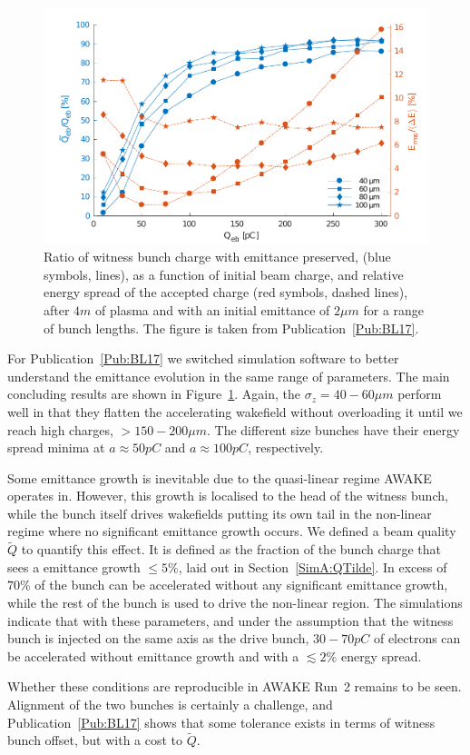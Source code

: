 \begin{figure}[hbt]
    \centering
    \includegraphics[width=0.8125\linewidth]{figures/BeamQuality}
    \caption{\label{Fig:Sum:BQ}
        Ratio of witness bunch charge with emittance preserved, (blue symbols, lines), as a function of initial beam charge, and relative energy spread of the accepted charge (red symbols, dashed lines), after $4\unit{m}$ of plasma and with an initial emittance of $2\unit{\mu m}$ for a range of bunch lengths.
        The figure is taken from Publication~\ref{Pub:BL17}.
    }
\end{figure}

For Publication~\ref{Pub:BL17} we switched simulation software to better understand the emittance evolution in the same range of parameters.
The main concluding results are shown in Figure~\ref{Fig:Sum:BQ}.
Again, the $\sigma_z = 40-60\unit{\mu m}$ perform well in that they flatten the accelerating wakefield without overloading it until we reach high charges, $> 150-200\unit{\mu m}$.
The different size bunches have their energy spread minima at $a\approx 50\unit{pC}$ and $a\approx 100\unit{pC}$, respectively.

Some emittance growth is inevitable due to the quasi-linear regime AWAKE operates in.
However, this growth is localised to the head of the witness bunch, while the bunch itself drives wakefields putting its own tail in the non-linear regime where no significant emittance growth occurs.
We defined a beam quality $\tilde{Q}$ to quantify this effect.
It is defined as the fraction of the bunch charge that sees a emittance growth $\leq 5\%$, laid out in Section~\ref{SimA:QTilde}.
In excess of $70\%$ of the bunch can be accelerated without any significant emittance growth, while the rest of the bunch is used to drive the non-linear region.
The simulations indicate that with these parameters, and under the assumption that the witness bunch is injected on the same axis as the drive bunch, $30-70\unit{pC}$ of electrons can be accelerated without emittance growth and with a $\lesssim 2\%$ energy spread.

Whether these conditions are reproducible in AWAKE Run~2 remains to be seen.
Alignment of the two bunches is certainly a challenge, and Publication~\ref{Pub:BL17} shows that some tolerance exists in terms of witness bunch offset, but with a cost to $\tilde{Q}$.
